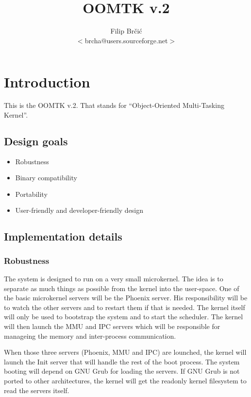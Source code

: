 \documentclass{article}
\title{OOMTK v.2}
\author{Filip Br\v ci\' c\\$<$brcha@users.sourceforge.net$>$}
\begin{document}
\maketitle

\section{Introduction}

This is the OOMTK v.2. That stands for ``Object-Oriented Multi-Tasking Kernel''.

\subsection{Design goals}

\begin{itemize}
\item Robustness
\item Binary compatibility
\item Portability
\item User-friendly and developer-friendly design
\end{itemize}

\subsection{Implementation details}

\subsubsection{Robustness}

The system is designed to run on a very small microkernel. The idea is to separate
as much things as possible from the kernel into the user-space. One of the basic
microkernel servers will be the Phoenix server. His responsibility will be to watch
the other servers and to restart them if that is needed. The kernel itself will
only be used to bootstrap the system and to start the scheduler. The kernel will then
launch the MMU and IPC servers which will be responsible for manageing the memory
and inter-process communication.

When those three servers (Phoenix, MMU and IPC) are lounched, the kernel will launch
the Init server that will handle the rest of the boot process. The system booting
will depend on GNU Grub for loading the servers. If GNU Grub is not ported to other
architectures, the kernel will get the readonly kernel filesystem to read the servers
itself.
\end{document}
